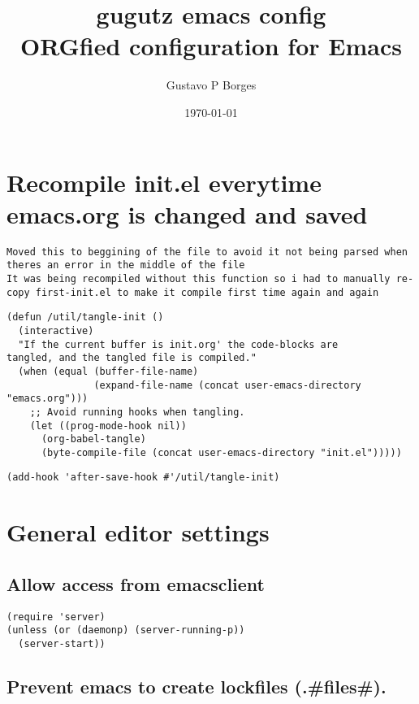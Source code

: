 \documentclass[11pt]{article}
\author{Gustavo P Borges}
\date{\today}
\title{gugutz emacs config\\\medskip
\large ORGfied configuration for Emacs}
\begin{document}
\maketitle
\setcounter{tocdepth}{0}
\tableofcontents


\section*{Recompile init.el everytime emacs.org is changed and saved}
\label{sec:orgf083100}

\begin{verbatim}
Moved this to beggining of the file to avoid it not being parsed when theres an error in the middle of the file
It was being recompiled without this function so i had to manually re-copy first-init.el to make it compile first time again and again
\end{verbatim}



\begin{verbatim}
(defun /util/tangle-init ()
  (interactive)
  "If the current buffer is init.org' the code-blocks are
tangled, and the tangled file is compiled."
  (when (equal (buffer-file-name)
               (expand-file-name (concat user-emacs-directory "emacs.org")))
    ;; Avoid running hooks when tangling.
    (let ((prog-mode-hook nil))
      (org-babel-tangle)
      (byte-compile-file (concat user-emacs-directory "init.el")))))
\end{verbatim}

\begin{verbatim}
(add-hook 'after-save-hook #'/util/tangle-init)
\end{verbatim}


\section*{General editor settings}
\label{sec:orgc55845a}

\subsection*{Allow access from emacsclient}
\label{sec:org811dc98}

\begin{verbatim}
(require 'server)
(unless (or (daemonp) (server-running-p))
  (server-start))
\end{verbatim}

\subsection*{Prevent emacs to create lockfiles (.\#files\#).}
\label{sec:orga0db61d}
\end{document}
